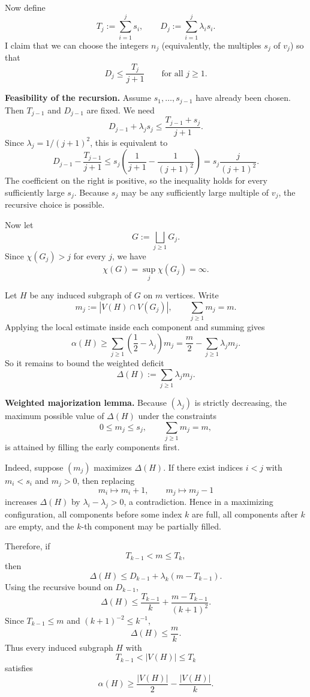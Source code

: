 Now define
\[
T_j:=\sum_{i=1}^j s_i,
\qquad
D_j:=\sum_{i=1}^j \lambda_i s_i.
\]
I claim that we can choose the integers $n_j$ (equivalently, the multiples $s_j$ of $v_j$) so that
\[
D_j\le \frac{T_j}{j+1}
\qquad\text{for all }j\ge 1.
\]

\medskip
\noindent
\textbf{Feasibility of the recursion.}
Assume $s_1,\dots,s_{j-1}$ have already been chosen. Then $T_{j-1}$ and $D_{j-1}$ are fixed. We need
\[
D_{j-1}+\lambda_js_j\le \frac{T_{j-1}+s_j}{j+1}.
\]
Since $\lambda_j=1/(j+1)^2$, this is equivalent to
\[
D_{j-1}-\frac{T_{j-1}}{j+1}
\le
s_j\left(\frac{1}{j+1}-\frac{1}{(j+1)^2}\right)
=
 s_j\frac{j}{(j+1)^2}.
\]
The coefficient on the right is positive, so the inequality holds for every sufficiently large $s_j$. Because $s_j$ may be any sufficiently large multiple of $v_j$, the recursive choice is possible.

Now let
\[
G:=\bigsqcup_{j\ge 1}G_j.
\]
Since $\chi(G_j)>j$ for every $j$, we have
\[
\chi(G)=\sup_j\chi(G_j)=\infty.
\]

Let $H$ be any induced subgraph of $G$ on $m$ vertices. Write
\[
m_j:=|V(H)\cap V(G_j)|,
\qquad
\sum_{j\ge 1}m_j=m.
\]
Applying the local estimate inside each component and summing gives
\[
\alpha(H)\ge \sum_{j\ge 1}\left(\frac12-\lambda_j\right)m_j
=
\frac m2-\sum_{j\ge 1}\lambda_jm_j.
\]
So it remains to bound the weighted deficit
\[
\Delta(H):=\sum_{j\ge 1}\lambda_jm_j.
\]

\medskip
\noindent
\textbf{Weighted majorization lemma.}
Because $(\lambda_j)$ is strictly decreasing, the maximum possible value of $\Delta(H)$ under the constraints
\[
0\le m_j\le s_j,
\qquad
\sum_{j\ge 1}m_j=m,
\]
is attained by filling the early components first.

Indeed, suppose $(m_j)$ maximizes $\Delta(H)$. If there exist indices $i<j$ with $m_i<s_i$ and $m_j>0$, then replacing
\[
m_i\mapsto m_i+1,
\qquad
m_j\mapsto m_j-1
\]
increases $\Delta(H)$ by $\lambda_i-\lambda_j>0$, a contradiction. Hence in a maximizing configuration, all components before some index $k$ are full, all components after $k$ are empty, and the $k$-th component may be partially filled.

Therefore, if
\[
T_{k-1}<m\le T_k,
\]
then
\[
\Delta(H)\le D_{k-1}+\lambda_k(m-T_{k-1}).
\]
Using the recursive bound on $D_{k-1}$,
\[
\Delta(H)\le \frac{T_{k-1}}{k}+\frac{m-T_{k-1}}{(k+1)^2}.
\]
Since $T_{k-1}\le m$ and $(k+1)^{-2}\le k^{-1}$,
\[
\Delta(H)\le \frac{m}{k}.
\]
Thus every induced subgraph $H$ with
\[
T_{k-1}<|V(H)|\le T_k
\]
satisfies
\[
\alpha(H)\ge \frac{|V(H)|}{2}-\frac{|V(H)|}{k}.
\]

